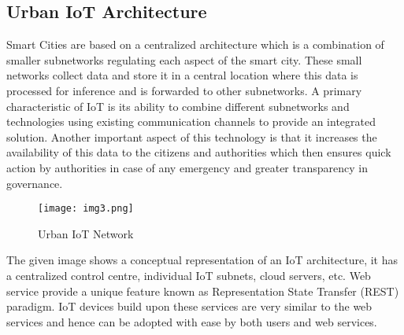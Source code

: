\documentclass[conference]{IEEEtran}
\begin{document}
\subsection{Urban IoT Architecture}
Smart Cities are based on a centralized architecture which is a combination of smaller subnetworks regulating each aspect of the smart city. These small networks collect data and store it in a central location where this data is processed for inference and is forwarded to other subnetworks. A primary characteristic of IoT is its ability to combine different subnetworks and technologies using existing communication channels to provide an integrated solution. Another important aspect of this technology is that it increases the availability of this data to the citizens and authorities which then ensures quick action by authorities in case of any emergency and greater transparency in governance.

\begin{figure}[H]
\centering
\texttt{[image: img3.png]}
\caption{Urban IoT Network}
\label{fig_sim}
\end{figure}

The given image shows a conceptual representation of an IoT architecture, it has a centralized control centre, individual IoT subnets, cloud servers, etc. Web service provide a unique feature known as Representation State Transfer (REST) paradigm. IoT devices build upon these services are very similar to the web services and hence can be adopted with ease by both users and web services. 
\end{document}
